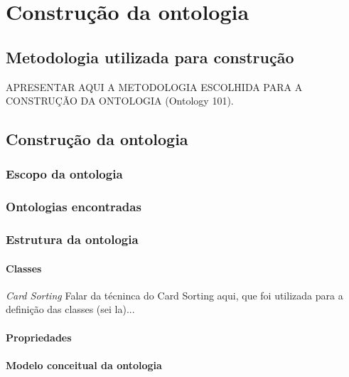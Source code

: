 \chapter{Construção da ontologia}

  \section{Metodologia utilizada para construção}
    
    APRESENTAR AQUI A METODOLOGIA ESCOLHIDA PARA A CONSTRUÇÃO DA ONTOLOGIA (Ontology 101).
    
  \section{Construção da ontologia}
    
    \subsection{Escopo da ontologia}
    
    \subsection{Ontologias encontradas}
   
      
      
    \subsection{Estrutura da ontologia}
      
      \subsubsection{Classes}
	
	\emph{\textit{Card Sorting}}
	  Falar da técninca do Card Sorting aqui, que foi utilizada para a definição das classes (sei la)...
      
    \subsubsection{Propriedades}
	
	
    \subsubsection{Modelo conceitual da ontologia}
    
      
    
      
  

  